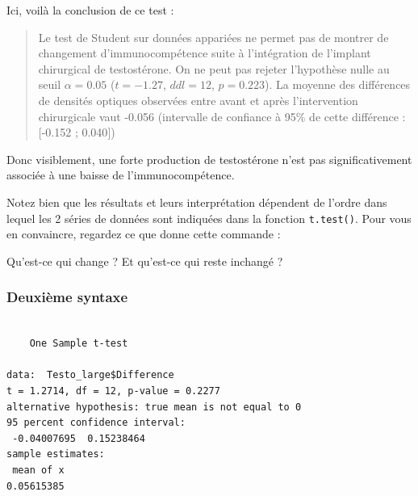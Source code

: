 \documentclass[
  french,
  a4paper,
  DIV=11,
  numbers=noendperiod,
  oneside]{scrreprt}
\newenvironment{Shaded}{}{}
\newcommand{\AttributeTok}[1]{\textcolor[rgb]{0.84,0.23,0.29}{#1}}
\newcommand{\CommentTok}[1]{\textcolor[rgb]{0.42,0.45,0.49}{#1}}
\newcommand{\ConstantTok}[1]{\textcolor[rgb]{0.00,0.36,0.77}{#1}}
\newcommand{\DecValTok}[1]{\textcolor[rgb]{0.00,0.36,0.77}{#1}}
\newcommand{\FunctionTok}[1]{\textcolor[rgb]{0.44,0.26,0.76}{#1}}
\newcommand{\NormalTok}[1]{\textcolor[rgb]{0.14,0.16,0.18}{#1}}
\newcommand{\SpecialCharTok}[1]{\textcolor[rgb]{0.00,0.36,0.77}{#1}}
\begin{document}
Ici, voilà la conclusion de ce test :

\begin{quote}
Le test de Student sur données appariées ne permet pas de montrer de
changement d'immunocompétence suite à l'intégration de l'implant
chirurgical de testostérone. On ne peut pas rejeter l'hypothèse nulle au
seuil \(\alpha = 0.05\) (\(t = -1.27\), \(ddl = 12\), \(p = 0.223\)). La
moyenne des différences de densités optiques observées entre avant et
après l'intervention chirurgicale vaut -0.056 (intervalle de confiance à
95\% de cette différence : {[}-0.152 ; 0.040{]})
\end{quote}

Donc visiblement, une forte production de testostérone n'est pas
significativement associée à une baisse de l'immunocompétence.

Notez bien que les résultats et leurs interprétation dépendent de
l'ordre dans lequel les 2 séries de données sont indiquées dans la
fonction \texttt{t.test()}. Pour vous en convaincre, regardez ce que
donne cette commande :

\begin{Shaded}
\end{Shaded}

Qu'est-ce qui change ? Et qu'est-ce qui reste inchangé ?

\subsubsection{Deuxième syntaxe}\label{deuxiuxe8me-syntaxe}

\begin{Shaded}
\end{Shaded}

\begin{verbatim}

    One Sample t-test

data:  Testo_large$Difference
t = 1.2714, df = 12, p-value = 0.2277
alternative hypothesis: true mean is not equal to 0
95 percent confidence interval:
 -0.04007695  0.15238464
sample estimates:
 mean of x 
0.05615385 
\end{verbatim}
\end{document}
